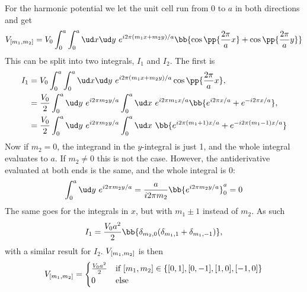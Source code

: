 \documentclass[main.tex]{subfiles}
\begin{document}
	For the harmonic potential we let the unit cell run from $ 0 $ to $ a $ in both directions and get
	\begin{equation}\label{key}
		V\coef{m_1, m_2} = V_0 \int_{0}^{a} \int_0^a \ud x \ud y \ e^{i 2\pi(m_1x + m_2y)/a} \bb{\cos\pp{\frac{2\pi}{a} x} + \cos\pp{\frac{2\pi}{a} y}}
	\end{equation}
	This can be split into two integrals, $ I_1 $ and $ I_2 $. The first is
	\begin{align}\label{key}
		I_1 &=  V_0 \int_{0}^{a} \int_0^a \ud x \ud y \ e^{i 2\pi(m_1x + m_2y)/a}\cos\pp{\frac{2\pi}{a} x}, \\
		&= \frac{V_0}{2} \int_{0}^{a} \ud y\ e^{i 2\pi m_2 y / a} \int_{0}^{a} \ud x \ e^{i 2\pi m_1 x/a} \bb{e^{i 2\pi x/a} + e^{-i 2\pi x/a}}, \\
		&= \frac{V_0}{2} \int_0^a \ud y\  e^{i 2\pi m_2 y / a} \int_{0}^{a} \ud x\ \bb{e^{i 2\pi(m_1+1) x/a} + e^{-i 2\pi (m_1-1)x/a}}
	\end{align}
	Now if $ m_2 = 0 $, the integrand in the $ y $-integral is just 1, and the whole integral evaluates to $ a $. If $ m_2 \neq 0 $ this is not the case. However, the antiderivative evaluated at both ends is the same, and the whole integral is 0:
	\begin{equation}\label{key}
		\int_{0}^{a} \ud y\ e^{i 2\pi m_2 y/a} = \frac{a}{i 2\pi m_2} \bb{e^{i2\pi m_2 y /a}}_0^a = 0
	\end{equation}
	The same goes for the integrals in $ x $, but with $ m_1 \pm 1 $ instead of $ m_2 $. As such
	\begin{equation}\label{key}
		I_1 = \frac{V_0 a^2}{2} \bb{\delta_{m_2,0} (\delta_{m_1, 1} + \delta_{m_1, -1})},
	\end{equation}
	with a similar result for $ I_2 $. $ V_{[m_1, m_2]} $ is then
	\begin{equation}\label{key}
		V_{[m_1, m_2]} = \begin{cases}
			\frac{V_0 a^2}{2} 	& \text{if } [m_1, m_2] \in \{[0,1], [0,-1], [1,0], [-1,0]\} \\
			0					& \text{else}
		\end{cases}
	\end{equation}
	
	
\end{document}
